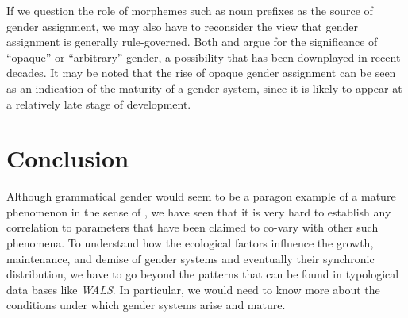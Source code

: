 \documentclass[output=collectionpaper]{langsci/langscibook}
\begin{document}
If we question the role of morphemes such as  noun prefixes as the source of gender assignment, we may also have to reconsider the view that gender assignment is generally rule-governed. Both  and  argue for the significance of ``opaque'' or ``arbitrary'' gender, a possibility that has been downplayed in recent decades. It may be noted that the rise of opaque gender assignment can be seen as an indication of the maturity of a gender system, since it is likely to appear at a relatively late stage of development.

\section{Conclusion}

Although grammatical gender would seem to be a paragon example of a mature phenomenon in the sense of \citet{Dahl2004}, we have seen that it is very hard to establish any correlation to parameters that have been claimed to co-vary with other such phenomena. To understand how the ecological factors influence the growth, maintenance, and demise of gender systems and eventually their synchronic distribution, we have to go beyond the patterns that can be found in typological data bases like \textit{WALS}. In particular, we would need to know more about the conditions under which gender systems arise and mature.
\sloppy
\printbibliography[heading=subbibliography,notkeyword=this]
\end{document}
